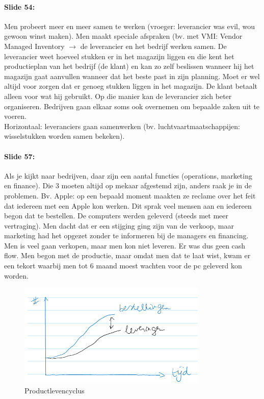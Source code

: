\documentclass[10pt,a4paper]{report}
\begin{document}
\paragraph{Slide 54:} Men probeert meer en meer samen te werken (vroeger: leverancier was evil, wou gewoon winst maken). Men maakt speciale afspraken (bv. met VMI: Vendor Managed Inventory $\rightarrow$ de leverancier en het bedrijf werken samen. De leverancier weet hoeveel stukken er in het magazijn liggen en die kent het productieplan van het bedrijf (de klant) en kan zo zelf beslissen wanneer hij het magazijn gaat aanvullen wanneer dat het beste past in zijn planning. Moet er wel altijd voor zorgen dat er genoeg stukken liggen in het magazijn. De klant betaalt alleen voor wat hij gebruikt. Op die manier kan de leverancier zich beter organiseren. Bedrijven gaan elkaar soms ook overnemen om bepaalde zaken uit te voeren.\\
Horizontaal: leveranciers gaan samenwerken (bv. luchtvaartmaatschappijen: wisselstukken worden samen bekeken).

\paragraph{Slide 57:} Als je kijkt naar bedrijven, daar zijn een aantal functies (operations, marketing en finance). Die 3 moeten altijd op mekaar afgestemd zijn, anders raak je in de problemen. Bv. Apple: op een bepaald moment maakten ze reclame over het feit dat iedereen met een Apple kon werken. Dit sprak veel mensen aan en iedereen begon dat te bestellen. De computers werden geleverd (steeds met meer vertraging). Men dacht dat er een stijging ging zijn van de verkoop, maar marketing had het opgezet zonder te informeren bij de managers en financing. Men is veel gaan verkopen, maar men kon niet leveren. Er was dus geen cash flow. Men begon met de productie, maar omdat men dat te laat wist, kwam er een tekort waarbij men tot 6 maand moest wachten voor de pc geleverd kon worden.


\begin{figure}[h!]
\centering
\includegraphics[width=90mm]{Les02_01.png}
\caption{Productlevencyclus} 
\label{les02_01}
\end{figure}
\end{document}
